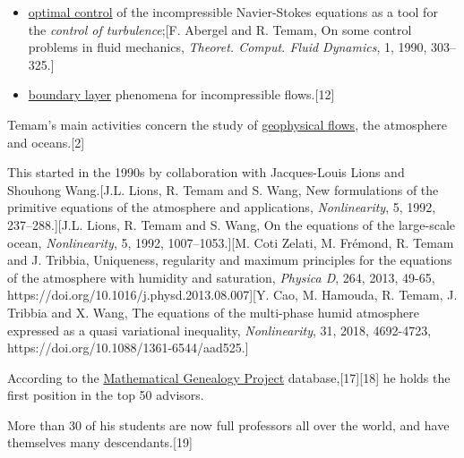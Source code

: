\documentclass{book}
\numberwithin{equation}{section}
\begin{document}
\begin{itemize}
    He was also the co-founder of the notion of \textit{inertial manifolds}[C. Foias, G.R. Sell and R. Temam, Inertial manifolds for nonlinear evolutionary equations, \textit{J. Diff. Equ.}, 73, 1988, 309--353.] together with Ciprian Foias and \href{https://en.wikipedia.org/wiki/George_R._Sell}{George R. Sell} and of exponential attractors[A. Eden, C. Foias, B. Nicolaenko and R. Temam, \textit{Exponential attractors for dissipative evolution equations}, Collection Recherches en Mathématiques Appliquées, Masson, Paris, and John Wiley, England, 1994.] together with Alp Eden, Ciprian Foias and Basil Nicolaenko;[2]
    \item \href{https://en.wikipedia.org/wiki/Optimal_control}{optimal control} of the incompressible Navier-Stokes equations as a tool for the \textit{control of turbulence};[F. Abergel and R. Temam, On some control problems in fluid mechanics, \textit{Theoret. Comput. Fluid Dynamics}, 1, 1990, 303--325.]
    \item \href{https://en.wikipedia.org/wiki/Boundary_layer}{boundary layer} phenomena for incompressible flows.[12]
\end{itemize}
Temam's main activities concern the study of \href{https://en.wikipedia.org/wiki/Geophysical_fluid_dynamics}{geophysical flows}, the atmosphere and oceans.[2]

This started in the 1990s by collaboration with Jacques-Louis Lions and Shouhong Wang.[J.L. Lions, R. Temam and S. Wang, New formulations of the primitive equations of the atmosphere and applications, \textit{Nonlinearity}, 5, 1992, 237--288.][J.L. Lions, R. Temam and S. Wang, On the equations of the large-scale ocean, \textit{Nonlinearity}, 5, 1992, 1007--1053.][M. Coti Zelati, M. Frémond, R. Temam and J. Tribbia, Uniqueness, regularity and maximum principles for the equations of the atmosphere with humidity and saturation, \textit{Physica D}, 264, 2013, 49-65, https://doi.org/10.1016/j.physd.2013.08.007][Y. Cao, M. Hamouda, R. Temam, J. Tribbia and X. Wang, The equations of the multi-phase humid atmosphere expressed as a quasi variational inequality, \textit{Nonlinearity}, 31, 2018, 4692-4723, https://doi.org/10.1088/1361-6544/aad525.]

%
According to the \href{https://en.wikipedia.org/wiki/Mathematical_Genealogy_Project}{Mathematical Genealogy Project} database,[17][18] he holds the first position in the top 50 advisors.

More than 30 of his students are now full professors all over the world, and have themselves many descendants.[19]
\end{document}
